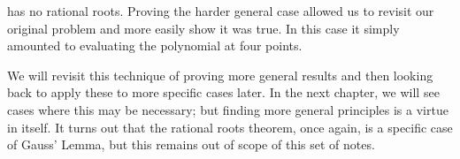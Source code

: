 has no rational roots. Proving the harder general case allowed us to revisit our original problem and more easily show it was true. In this case it simply amounted to evaluating the polynomial at four points.

\vspace{\baselineskip}

We will revisit this technique of proving more general results and then looking back to apply these to more specific cases later. In the next chapter, we will see cases where this may be necessary; but finding more general principles is a virtue in itself. It turns out that the rational roots theorem, once again, is a specific case of Gauss' Lemma, but this remains out of scope of this set of notes.